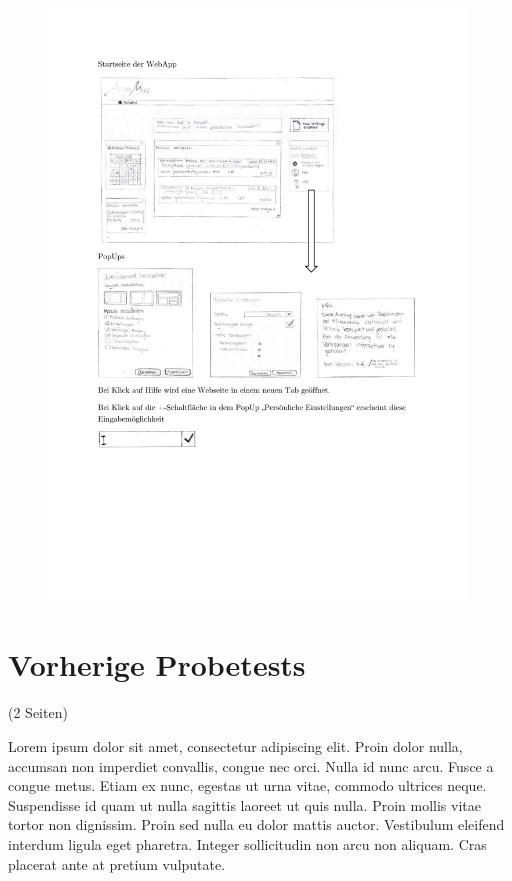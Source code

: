\begin{figure}
  \vspace{-20pt}
  \begin{center}
    \includegraphics[page=5,width=0.99\textwidth]{./images/prototypWeb}
  \end{center}
  \vspace{-40pt}
\end{figure}


\clearpage
\section{Vorherige Probetests}
\label{sec:probetests}

(2 Seiten)

Lorem ipsum dolor sit amet, consectetur adipiscing elit. Proin dolor nulla, accumsan non imperdiet convallis, congue nec orci. Nulla id nunc arcu. Fusce a congue metus. Etiam ex nunc, egestas ut urna vitae, commodo ultrices neque. Suspendisse id quam ut nulla sagittis laoreet ut quis nulla. Proin mollis vitae tortor non dignissim. Proin sed nulla eu dolor mattis auctor. Vestibulum eleifend interdum ligula eget pharetra. Integer sollicitudin non arcu non aliquam. Cras placerat ante at pretium vulputate.

